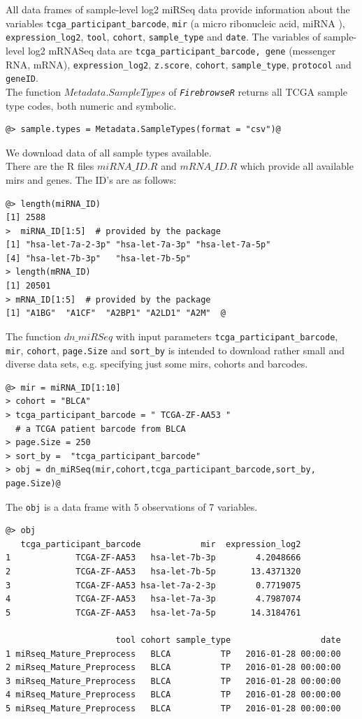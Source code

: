 \documentclass{TechReport}
\begin{document}
All data frames of sample-level log2 miRSeq data provide information
about the variables {\tt tcga\_participant\_barcode}, {\tt mir} (a
micro ribonucleic acid, miRNA ), {\tt expression\_log2}, {\tt tool},
{\tt cohort}, {\tt sample\_type} and {\tt date}. The variables of
sample-level log2 mRNASeq data are {\tt tcga\_participant\_barcode,
  gene} (messenger RNA, mRNA), {\tt expression\_log2}, {\tt z.score},
{\tt cohort}, {\tt sample\_type},
{\tt protocol} and {\tt geneID}.\\
The function $Metadata.SampleTypes$ of \texttt{\em FirebrowseR}
returns all TCGA sample type codes, both numeric and symbolic.
\begin{lstlisting}[style=base]
@> sample.types = Metadata.SampleTypes(format = "csv")@
 \end{lstlisting}
 We download data of all sample types available.\\
 There are the R files $miRNA\_ID.R$ and $mRNA\_ID.R$ which provide
 all available mirs and genes. The ID's are as follows:
\begin{lstlisting}[style=base]
@> length(miRNA_ID)
[1] 2588
>  miRNA_ID[1:5]  # provided by the package
[1] "hsa-let-7a-2-3p" "hsa-let-7a-3p" "hsa-let-7a-5p" 
[4] "hsa-let-7b-3p"   "hsa-let-7b-5p"         
> length(mRNA_ID)
[1] 20501
> mRNA_ID[1:5]  # provided by the package
[1] "A1BG"  "A1CF"  "A2BP1" "A2LD1" "A2M"  @
\end{lstlisting}
The function $dn\_miRSeq$ with input parameters  {\tt tcga\_participant\_barcode},
{\tt mir}, {\tt cohort}, {\tt page.Size} and {\tt sort\_by} is intended to download 
rather small and diverse data sets, e.g. specifying just some mirs, cohorts and
barcodes.
\begin{lstlisting}[style=base]
@> mir = miRNA_ID[1:10]
> cohort = "BLCA"
> tcga_participant_barcode = " TCGA-ZF-AA53 "  
  # a TCGA patient barcode from BLCA
> page.Size = 250 
> sort_by =  "tcga_participant_barcode"
> obj = dn_miRSeq(mir,cohort,tcga_participant_barcode,sort_by, 
page.Size)@
\end{lstlisting}
The {\tt obj} is a data frame with 5 observations of 7 variables.
\begin{lstlisting}[style=base]
@> obj
   tcga_participant_barcode            mir  expression_log2
1             TCGA-ZF-AA53   hsa-let-7b-3p        4.2048666
2             TCGA-ZF-AA53   hsa-let-7b-5p       13.4371320
3             TCGA-ZF-AA53 hsa-let-7a-2-3p        0.7719075
4             TCGA-ZF-AA53   hsa-let-7a-3p        4.7987074
5             TCGA-ZF-AA53   hsa-let-7a-5p       14.3184761

                      tool cohort sample_type                  date         
1 miRseq_Mature_Preprocess   BLCA          TP   2016-01-28 00:00:00
2 miRseq_Mature_Preprocess   BLCA          TP   2016-01-28 00:00:00
3 miRseq_Mature_Preprocess   BLCA          TP   2016-01-28 00:00:00
4 miRseq_Mature_Preprocess   BLCA          TP   2016-01-28 00:00:00
5 miRseq_Mature_Preprocess   BLCA          TP   2016-01-28 00:00:00
\end{lstlisting}
\end{document}
